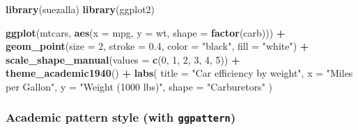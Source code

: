\documentclass[
]{article}
\newenvironment{Shaded}{\begin{snugshade}}{\end{snugshade}}
\newcommand{\AttributeTok}[1]{\textcolor[rgb]{0.13,0.29,0.53}{#1}}
\newcommand{\DecValTok}[1]{\textcolor[rgb]{0.00,0.00,0.81}{#1}}
\newcommand{\FloatTok}[1]{\textcolor[rgb]{0.00,0.00,0.81}{#1}}
\newcommand{\FunctionTok}[1]{\textcolor[rgb]{0.13,0.29,0.53}{\textbf{#1}}}
\newcommand{\NormalTok}[1]{#1}
\newcommand{\OtherTok}[1]{\textcolor[rgb]{0.56,0.35,0.01}{#1}}
\newcommand{\SpecialCharTok}[1]{\textcolor[rgb]{0.81,0.36,0.00}{\textbf{#1}}}
\newcommand{\StringTok}[1]{\textcolor[rgb]{0.31,0.60,0.02}{#1}}
\begin{document}
\begin{Shaded}
\begin{Highlighting}[]
\FunctionTok{library}\NormalTok{(suezalla)}
\FunctionTok{library}\NormalTok{(ggplot2)}

\FunctionTok{ggplot}\NormalTok{(mtcars, }\FunctionTok{aes}\NormalTok{(}\AttributeTok{x =}\NormalTok{ mpg, }\AttributeTok{y =}\NormalTok{ wt, }\AttributeTok{shape =} \FunctionTok{factor}\NormalTok{(carb))) }\SpecialCharTok{+}
  \FunctionTok{geom\_point}\NormalTok{(}\AttributeTok{size =} \DecValTok{2}\NormalTok{, }\AttributeTok{stroke =} \FloatTok{0.4}\NormalTok{, }\AttributeTok{color =} \StringTok{"black"}\NormalTok{, }\AttributeTok{fill =} \StringTok{"white"}\NormalTok{) }\SpecialCharTok{+}
  \FunctionTok{scale\_shape\_manual}\NormalTok{(}\AttributeTok{values =} \FunctionTok{c}\NormalTok{(}\DecValTok{0}\NormalTok{, }\DecValTok{1}\NormalTok{, }\DecValTok{2}\NormalTok{, }\DecValTok{3}\NormalTok{, }\DecValTok{4}\NormalTok{, }\DecValTok{5}\NormalTok{)) }\SpecialCharTok{+}
  \FunctionTok{theme\_academic1940}\NormalTok{() }\SpecialCharTok{+}
  \FunctionTok{labs}\NormalTok{(}
    \AttributeTok{title =} \StringTok{"Car efficiency by weight"}\NormalTok{,}
    \AttributeTok{x =} \StringTok{"Miles per Gallon"}\NormalTok{,}
    \AttributeTok{y =} \StringTok{"Weight (1000 lbs)"}\NormalTok{,}
    \AttributeTok{shape =} \StringTok{"Carburetors"}
\NormalTok{  )}
\end{Highlighting}
\end{Shaded}

\subsubsection{\texorpdfstring{Academic pattern style (with
\texttt{ggpattern})}{Academic pattern style (with ggpattern)}}\label{academic-pattern-style-with-ggpattern}

\begin{Shaded}
\end{Shaded}
\end{document}
